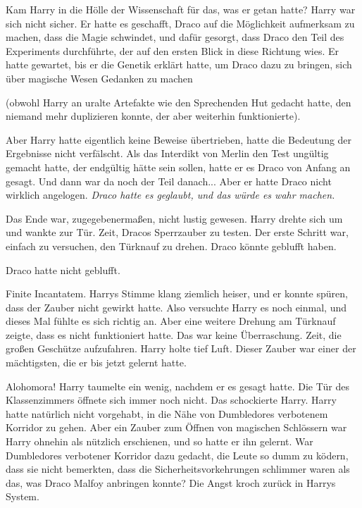 Kam Harry in die Hölle der Wissenschaft für das, was er getan hatte? Harry war
sich nicht sicher. Er hatte es geschafft, Draco auf die Möglichkeit aufmerksam
zu machen, dass die Magie schwindet, und dafür gesorgt, dass Draco den Teil des
Experiments durchführte, der auf den ersten Blick in diese Richtung wies. Er
hatte gewartet, bis er die Genetik erklärt hatte, um Draco dazu zu bringen, sich
über magische Wesen Gedanken zu machen

(obwohl Harry an uralte Artefakte wie den Sprechenden Hut gedacht hatte, den
niemand mehr duplizieren konnte, der aber weiterhin funktionierte).

Aber Harry hatte eigentlich keine Beweise übertrieben, hatte die Bedeutung der
Ergebnisse nicht verfälscht. Als das Interdikt von Merlin den Test ungültig
gemacht hatte, der endgültig hätte sein sollen, hatte er es Draco von Anfang an
gesagt. Und dann war da noch der Teil danach... Aber er hatte Draco nicht
wirklich angelogen. \emph{Draco hatte es geglaubt, und das würde es wahr
machen.}

Das Ende war, zugegebenermaßen, nicht lustig gewesen. Harry drehte sich um und
wankte zur Tür. Zeit, Dracos Sperrzauber zu testen. Der erste Schritt war,
einfach zu versuchen, den Türknauf zu drehen. Draco könnte geblufft haben.

Draco hatte nicht geblufft.

\glqq Finite Incantatem.\grqq{} Harrys Stimme klang ziemlich heiser, und er
konnte spüren, dass der Zauber nicht gewirkt hatte. Also versuchte Harry es noch
einmal, und dieses Mal fühlte es sich richtig an. Aber eine weitere Drehung am
Türknauf zeigte, dass es nicht funktioniert hatte. Das war keine Überraschung.
Zeit, die großen Geschütze aufzufahren. Harry holte tief Luft. Dieser Zauber war
einer der mächtigsten, die er bis jetzt gelernt hatte.

\glqq Alohomora!\grqq{} Harry taumelte ein wenig, nachdem er es gesagt hatte.
Die Tür des Klassenzimmers öffnete sich immer noch nicht. Das schockierte Harry.
Harry hatte natürlich nicht vorgehabt, in die Nähe von Dumbledores verbotenem
Korridor zu gehen. Aber ein Zauber zum Öffnen von magischen Schlössern war Harry
ohnehin als nützlich erschienen, und so hatte er ihn gelernt. War Dumbledores
verbotener Korridor dazu gedacht, die Leute so dumm zu ködern, dass sie nicht
bemerkten, dass die Sicherheitsvorkehrungen schlimmer waren als das, was Draco
Malfoy anbringen konnte? Die Angst kroch zurück in Harrys System.

